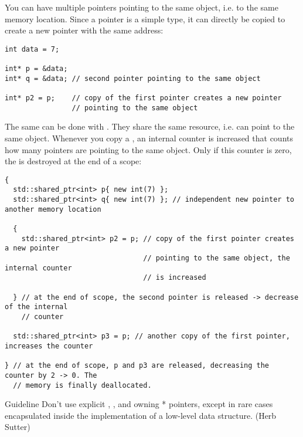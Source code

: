You can have multiple pointers pointing to the same object, i.e. to the same memory location. Since a pointer is a simple type, it can directly be copied
to create a new pointer with the same address:
%
\begin{verbatim}
int data = 7;

int* p = &data;
int* q = &data; // second pointer pointing to the same object

int* p2 = p;    // copy of the first pointer creates a new pointer
                // pointing to the same object
\end{verbatim}
%
The same can be done with . They share the same resource, i.e. can point to the same object. Whenever you copy a , an internal
counter is increased that counts how many pointers are pointing to the same object. Only if this counter is zero, the  is destroyed at the
end of a scope:
\begin{verbatim}
{
  std::shared_ptr<int> p{ new int(7) };
  std::shared_ptr<int> q{ new int(7) }; // independent new pointer to another memory location

  {
    std::shared_ptr<int> p2 = p; // copy of the first pointer creates a new pointer
                                 // pointing to the same object, the internal counter
                                 // is increased

  } // at the end of scope, the second pointer is released -> decrease of the internal
    // counter

  std::shared_ptr<int> p3 = p; // another copy of the first pointer, increases the counter

} // at the end of scope, p and p3 are released, decreasing the counter by 2 -> 0. The
  // memory is finally deallocated.
\end{verbatim}

\begin{guideline}{Guideline}
  Don’t use explicit , , and owning * pointers, except in rare cases encapsulated inside the implementation of a
  low-level data structure. (Herb Sutter)
\end{guideline}
